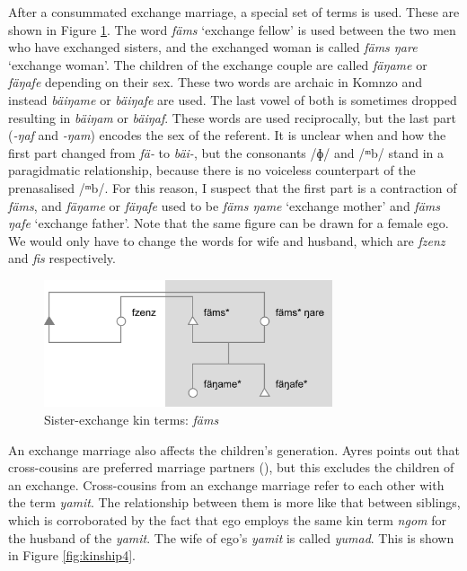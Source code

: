 After a consummated exchange marriage, a special set of terms is used. These are shown in Figure \ref{fig:kinship3}. The word \emph{fäms} `exchange fellow' is used between the two men who have exchanged sisters, and the exchanged woman is called \emph{fäms ŋare} `exchange woman'. The children of the exchange couple are called \emph{fäŋame} or \emph{fäŋafe} depending on their sex. These two words are archaic in Komnzo and instead \emph{bäiŋame} or \emph{bäiŋafe} are used. The last vowel of both is sometimes dropped resulting in \emph{bäiŋam} or \emph{bäiŋaf}. These words are used reciprocally, but the last part (\emph{-ŋaf} and \emph{-ŋam}) encodes the sex of the referent. It is unclear when and how the first part changed from \emph{fä-} to \emph{bäi-}, but the consonants /ɸ/ and /{ᵐ}b/ stand in a paragidmatic relationship, because there is no voiceless counterpart of the prenasalised /{ᵐ}b/. For this reason, I suspect that the first part is a contraction of \emph{fäms}, and \emph{fäŋame} or \emph{fäŋafe} used to be \emph{fäms ŋame} `exchange mother' and \emph{fäms ŋafe} `exchange father'. Note that the same figure can be drawn for a female ego. We would only have to change the words for wife and husband, which are \emph{fzenz} and \emph{fis} respectively.

\begin{figure}
	\includegraphics[width=8.5cm]{figures/kinship3.png}
	\caption[Sister-exchange kin terms: \emph{fäms}]{Sister-exchange kin terms: \emph{fäms}}
	\label{fig:kinship3}
\end{figure}%

An exchange marriage also affects the children's generation. Ayres points out that cross-cousins are preferred marriage partners (\citeyear[217]{Ayres:ws}), but this excludes the children of an exchange. Cross-cousins from an exchange marriage refer to each other with the term \emph{yamit}. The relationship between them is more like that between siblings, which is corroborated by the fact that ego employs the same kin term \emph{ngom} for the husband of the \emph{yamit}. The wife of ego's \emph{yamit} is called \emph{yumad}. This is shown in Figure \ref{fig:kinship4}.

